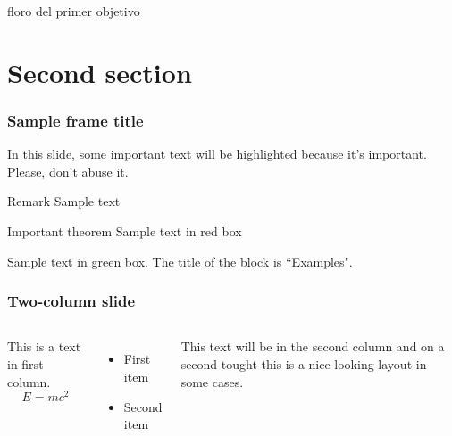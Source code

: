 \documentclass{beamer}
\begin{document}


\begin{frame}
  floro del primer objetivo
\end{frame}

\section{Second section}

\begin{frame}
\frametitle{Sample frame title}

In this slide, some important text will be
\alert{highlighted} because it's important.
Please, don't abuse it.

\begin{block}{Remark}
Sample text
\end{block}

\begin{alertblock}{Important theorem}
Sample text in red box
\end{alertblock}

\begin{examples}
Sample text in green box. The title of the block is ``Examples".
\end{examples}
\end{frame}


\begin{frame}
\frametitle{Two-column slide}

\begin{columns}

This is a text in first column.
$$E=mc^2$$
\begin{itemize}
\item First item
\item Second item
\end{itemize}

This text will be in the second column
and on a second tought this is a nice looking
layout in some cases.
\end{columns}
\end{frame}
\end{document}
